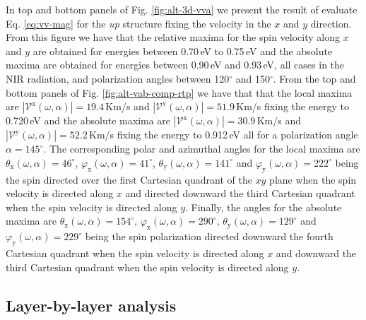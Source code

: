 \documentclass[prb,11pt,tightenlines,twocolumn,aps]{revtex4-1}
\begin{document}

In top and bottom panels of Fig. \ref{fig:alt-3d-vva} we present the
result of evaluate Eq. \eqref{eq:vv-mag} for the
\emph{up} structure fixing the velocity in the $x$ and $y$ direction.
% 
From this figure we have that the relative maxima for the spin velocity along
$x$ and $y$ are obtained for energies between 0.70\,eV to 0.75\,eV and the
absolute maxima are obtained for energies between 0.90\,eV and 0.93\,eV, all
cases in the NIR radiation, and polarization angles between 120$^{\circ}$ and
150$^{\circ}$.
% 
From the top and bottom panels of Fig. \ref{fig:alt-vab-comp-rtp} we have that
that the local maxima are $|\mathcal{V}^{\mathrm{x}} (\omega,\alpha)| =
19.4$\,Km/s and $|\mathcal{V}^{\mathrm{y}} (\omega,\alpha)| = 51.9$\,Km/s
fixing the energy to 0.720\,eV and the absolute maxima are
$|\mathcal{V}^{\mathrm{x}} (\omega,\alpha)| = 30.9$\,Km/s and
$|\mathcal{V}^{\mathrm{y}} (\omega,\alpha)| = 52.2$\,Km/s fixing the energy to
0.912\,eV all for a polarization angle $\alpha=145^{\circ}$.
% 
The corresponding polar and azimuthal angles for the local maxima are
$\theta_{\mathrm{x}} (\omega,\alpha) = 46^{\circ}$, $\varphi_{\mathrm{x}}
(\omega,\alpha) = 41^{\circ}$, $\theta_{\mathrm{y}} (\omega,\alpha) =
141^{\circ}$ and $\varphi_{\mathrm{y}} (\omega,\alpha) = 222^{\circ}$ being the
spin directed over the first Cartesian quadrant of the $xy$ plane when the spin
velocity is directed along $x$ and directed downward the third Cartesian
quadrant when the spin velocity is directed along $y$. Finally, the angles for
the absolute maxima are $\theta_{\mathrm{x}}(\omega,\alpha) = 154^{\circ}$,
$\varphi_{\mathrm{x}} (\omega,\alpha) = 290^{\circ}$, $\theta_{\mathrm{y}}
(\omega,\alpha) = 129^{\circ}$ and $\varphi_{\mathrm{y}} (\omega,\alpha) =
229^{\circ}$ being the spin polarization directed downward the fourth Cartesian
quadrant when the spin velocity is directed along $x$ and downward the third
Cartesian quadrant when the spin velocity is directed along $y$.


\subsection{Layer-by-layer analysis} %
\label{sec:res-layer_by_layer_analysis}
\end{document}
